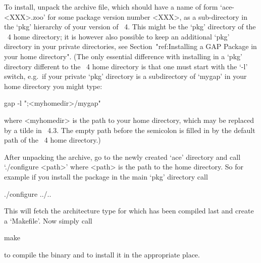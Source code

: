 


To install, unpack the archive file, which should have a name of  form
`ace-<XXX>.zoo'  for  some  package  version  number   <XXX>,   as   a
sub-directory in the `pkg' hierarchy of your version of {\GAP}~4. This
might be the `pkg' directory of the {\GAP}~4  home  directory;  it  is
however also possible to keep an additional `pkg'  directory  in  your
private directories, see Section~"ref:Installing a GAP Package in your
home directory". (The only essential difference with installing {\ACE}
in a `pkg' directory different to the {\GAP}~4 home directory is  that
one must start {\GAP} with the `-l' switch, e.g.~if your private `pkg'
directory is a subdirectory of `mygap'  in  your  home  directory  you
might type:

gap -l ";<myhomedir>/mygap"

where <myhomedir> is the path to your home  directory,  which  may  be
replaced by a tilde in {\GAP}~4.3. The empty path before the semicolon
is filled in by the default path of the {\GAP}~4 home directory.)

After unpacking the archive, go to the newly created  `ace'  directory
and call `./configure <path>' where <path> is the path to  the  {\GAP}
home directory. So for example if you install the package in the  main
`pkg' directory call

\begintt
./configure ../..
\endtt

This  will fetch  the  architecture  type for  which  {\GAP} has  been
compiled last and create a `Makefile'. Now simply call

\begintt
make
\endtt

to compile the binary and to install it in the appropriate place.

